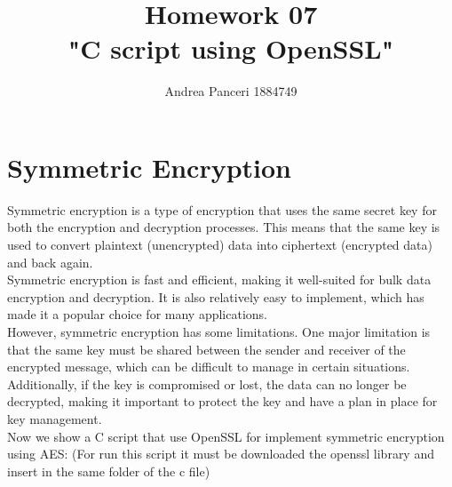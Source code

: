 \documentclass{article}
\title{Homework 07\\"C script using OpenSSL"}
\author{Andrea Panceri 1884749}
\begin{document}
\maketitle

\section{Symmetric Encryption}
Symmetric encryption is a type of encryption that uses the same secret key for both the encryption and decryption processes. This means that the same key is used to convert plaintext (unencrypted) data into ciphertext (encrypted data) and back again.\\
Symmetric encryption is fast and efficient, making it well-suited for bulk data encryption and decryption. It is also relatively easy to implement, which has made it a popular choice for many applications.\\
However, symmetric encryption has some limitations. One major limitation is that the same key must be shared between the sender and receiver of the encrypted message, which can be difficult to manage in certain situations. Additionally, if the key is compromised or lost, the data can no longer be decrypted, making it important to protect the key and have a plan in place for key management.\\
Now we show a C script that use OpenSSL for implement symmetric encryption using AES: (For run this script it must be downloaded the openssl library and insert in the same folder of the c file)
\end{document}
